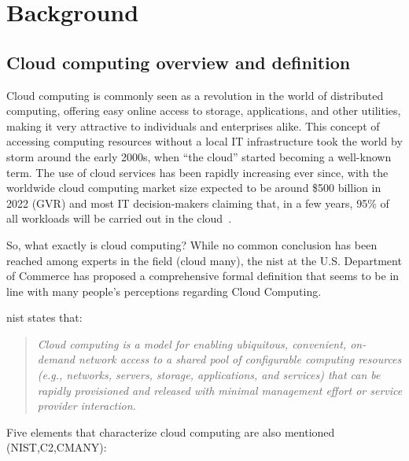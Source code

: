\chapter{Background}\label{ch:background}


\section{Cloud computing overview and definition}

Cloud computing is commonly seen as a revolution in the world of distributed computing, offering easy online access to storage, applications, and other utilities, making it very attractive to individuals and enterprises alike. This concept of accessing computing resources without a local IT infrastructure took the world by storm around the early 2000s, when ``the cloud'' started becoming a well-known term. The use of cloud services has been rapidly increasing ever since, with the worldwide cloud computing market size expected to be around \$500 billion in 2022 (GVR) and most IT decision-makers claiming that, in a few years, 95\% of all workloads will be carried out in the cloud~\cite{logicmonitor:cloud}. 

So, what exactly is cloud computing? While no common conclusion has been reached among experts in the field (cloud many), the \ac{nist} at the U.S. Department of Commerce has proposed a comprehensive formal definition that seems to be in line with many people's perceptions regarding Cloud Computing.

\ac{nist} states that: \blockquote{\textit{Cloud computing is a model for enabling ubiquitous, convenient, on-demand network access to a shared pool of configurable computing resources (e.g., networks, servers, storage, applications, and services) that can be rapidly provisioned and released with minimal management effort or service provider interaction.}}

Five elements that characterize cloud computing are also mentioned (NIST,C2,CMANY):

